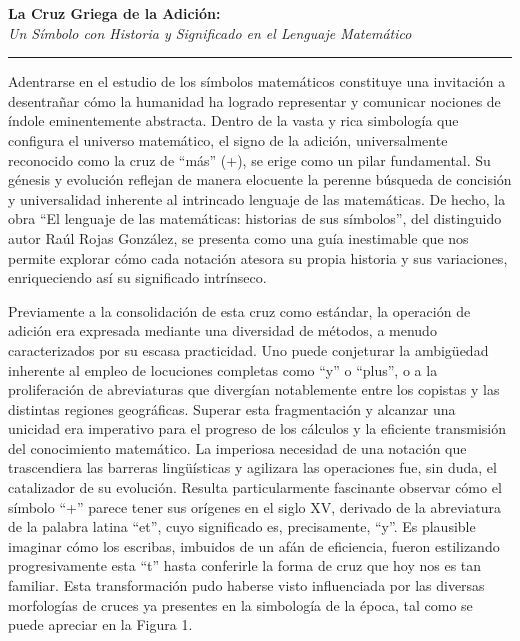 \documentclass[11pt, a4paper]{article}
\newcommand{\ensayoTitulo}[2]{%
  \begin{center}
    \vspace*{1cm}
    {\fontsize{36}{38}\selectfont\textbf{#1}} \\
    \vspace{0.4cm}
    {\fontsize{18}{20}\selectfont\textit{#2}}
    \vspace*{1.5cm}
    \hrule
    \vspace*{0.3cm}
  \end{center}
}
\begin{document}
\ensayoTitulo{La Cruz Griega de la Adición:}{Un Símbolo con Historia y Significado en el Lenguaje Matemático}

Adentrarse en el estudio de los símbolos matemáticos constituye una invitación a desentrañar cómo la humanidad ha logrado representar y comunicar nociones de índole eminentemente abstracta. Dentro de la vasta y rica simbología que configura el universo matemático, el signo de la adición, universalmente reconocido como la cruz de ``más'' (+), se erige como un pilar fundamental. Su génesis y evolución reflejan de manera elocuente la perenne búsqueda de concisión y universalidad inherente al intrincado lenguaje de las matemáticas. De hecho, la obra ``El lenguaje de las matemáticas: historias de sus símbolos'', del distinguido autor Raúl Rojas González, se presenta como una guía inestimable que nos permite explorar cómo cada notación atesora su propia historia y sus variaciones, enriqueciendo así su significado intrínseco.

Previamente a la consolidación de esta cruz como estándar, la operación de adición era expresada mediante una diversidad de métodos, a menudo caracterizados por su escasa practicidad. Uno puede conjeturar la ambigüedad inherente al empleo de locuciones completas como ``y'' o ``plus'', o a la proliferación de abreviaturas que divergían notablemente entre los copistas y las distintas regiones geográficas. Superar esta fragmentación y alcanzar una unicidad era imperativo para el progreso de los cálculos y la eficiente transmisión del conocimiento matemático. La imperiosa necesidad de una notación que trascendiera las barreras lingüísticas y agilizara las operaciones fue, sin duda, el catalizador de su evolución. Resulta particularmente fascinante observar cómo el símbolo ``+'' parece tener sus orígenes en el siglo XV, derivado de la abreviatura de la palabra latina ``et'', cuyo significado es, precisamente, ``y''. Es plausible imaginar cómo los escribas, imbuidos de un afán de eficiencia, fueron estilizando progresivamente esta ``t'' hasta conferirle la forma de cruz que hoy nos es tan familiar. Esta transformación pudo haberse visto influenciada por las diversas morfologías de cruces ya presentes en la simbología de la época, tal como se puede apreciar en la Figura 1.
\end{document}
